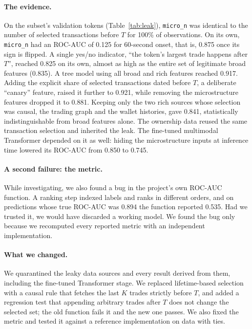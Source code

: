 \paragraph{The evidence.}
On the subset's validation tokens (Table~\ref{tab:leak}), \texttt{micro\_n} was identical to the number of selected transactions before $T$ for 100\% of observations. On its own, \texttt{micro\_n} had an ROC-AUC of 0.125 for 60-second onset, that is, 0.875 once its sign is flipped. A single yes/no indicator, ``the token's largest trade happens after $T$'', reached 0.825 on its own, almost as high as the entire set of legitimate broad features (0.835). A tree model using all broad and rich features reached 0.917. Adding the explicit share of selected transactions dated before $T$, a deliberate ``canary'' feature, raised it further to 0.921, while removing the microstructure features dropped it to 0.881. Keeping only the two rich sources whose selection was causal, the trading graph and the wallet histories, gave 0.841, statistically indistinguishable from broad features alone. The ownership data reused the same transaction selection and inherited the leak. The fine-tuned multimodal Transformer depended on it as well: hiding the microstructure inputs at inference time lowered its ROC-AUC from 0.850 to 0.745.

\begin{table}[t]
\centering
\caption{Leak case study on the multimodal subset (validation tokens; 8,027 eligible observations of 600 tokens; 60-second horizon). Single-feature ROC-AUC values below 0.5 mean that lower values of the feature predict onset.}
\label{tab:leak}
\tabsize

\end{table}

\paragraph{A second failure: the metric.}
While investigating, we also found a bug in the project's own ROC-AUC function. A ranking step indexed labels and ranks in different orders, and on predictions whose true ROC-AUC was 0.894 the function reported 0.535. Had we trusted it, we would have discarded a working model. We found the bug only because we recomputed every reported metric with an independent implementation.

\paragraph{What we changed.}
We quarantined the leaky data sources and every result derived from them, including the fine-tuned Transformer stage. We replaced lifetime-based selection with a causal rule that fetches the last $K$ trades strictly before $T$, and added a regression test that appending arbitrary trades after $T$ does not change the selected set; the old function fails it and the new one passes. We also fixed the metric and tested it against a reference implementation on data with ties.

